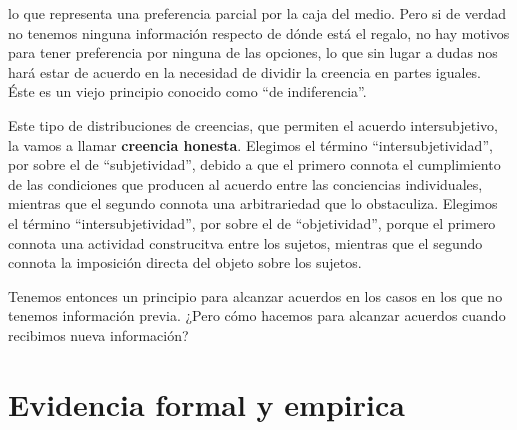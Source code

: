 \documentclass[a4paper,10pt]{book}
\theoremstyle{definition}
\begin{document}
lo que representa una preferencia parcial por la caja del medio.
Pero si de verdad no tenemos ninguna información respecto de dónde está el regalo, no hay motivos para tener preferencia por ninguna de las opciones, lo que sin lugar a dudas nos hará estar de acuerdo en la necesidad de dividir la creencia en partes iguales.
Éste es un viejo principio conocido como ``de indiferencia''.

\begin{figure}[H]
\centering
{} 
\end{figure}

Este tipo de distribuciones de creencias, que permiten el acuerdo intersubjetivo, la vamos a llamar \textbf{creencia honesta}.
Elegimos el término ``intersubjetividad'', por sobre el de ``subjetividad'', debido a que el primero connota el cumplimiento de las condiciones que producen al acuerdo entre las conciencias individuales, mientras que el segundo connota una arbitrariedad que lo obstaculiza.
Elegimos el término ``intersubjetividad'', por sobre el de ``objetividad'', porque el primero connota una actividad construcitva entre los sujetos, mientras que el segundo connota la imposición directa del objeto sobre los sujetos.


Tenemos entonces un principio para alcanzar acuerdos en los casos en los que no tenemos información previa.
¿Pero cómo hacemos para alcanzar acuerdos cuando recibimos nueva información?

\section{Evidencia formal y empirica}
\end{document}

